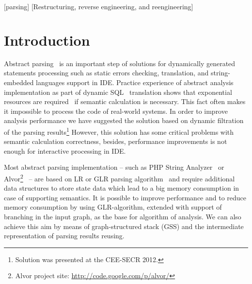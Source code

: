 \documentclass{acm_proc_article-sp}
\begin{document}
[parsing]
[Restructuring, reverse engineering, and reengineering]




\section{Introduction}

Abstract parsing~\cite{Doh:2009:APS:1615441.1615461} is an important step of solutions for dynamically generated statements processing such  as static errors checking, translation, and string-embedded languages support in IDE. Practice experience of abstract analysis implementation as part of dynamic SQL~\cite{SQLISO} translation shows that  exponential resources are required~\cite{GrigorevDSQL} if semantic calculation is necessary. This fact often makes it impossible to process the code of real-world systems. In order to improve analysis performance we have suggested the solution based on dynamic filtration of the parsing results\footnote{Solution was presented at the CEE-SECR 2012.} However, this solution has some critical problems with semantic calculation correctness, besides, performance improvements is not enough for interactive processing in IDE.

Most abstract parsing implementation -- such as PHP String Analyzer~\cite{Minamide:2005:SAD:1060745.1060809} or Alvor\footnote{Alvor project site: \href{http://code.google.com/p/alvor/}{http://code.google.com/p/alvor/}}~\cite{AlvorConf,Annamaa:2010:ITA:1947873.1947886} -- are based on LR or GLR parsing algorithm~\cite{Grune:2010:PTP:1951778} and require additional data structures to store state data which lead to a big memory consumption in case of supporting semantics. It is possible to improve performance and to reduce memory consumption by using GLR-algorithm, extended with support of branching in the input graph, as the base for algorithm of analysis. We can also achieve this aim by means of graph-structured stack (GSS) and the intermediate representation of parsing results reusing.
\end{document}

